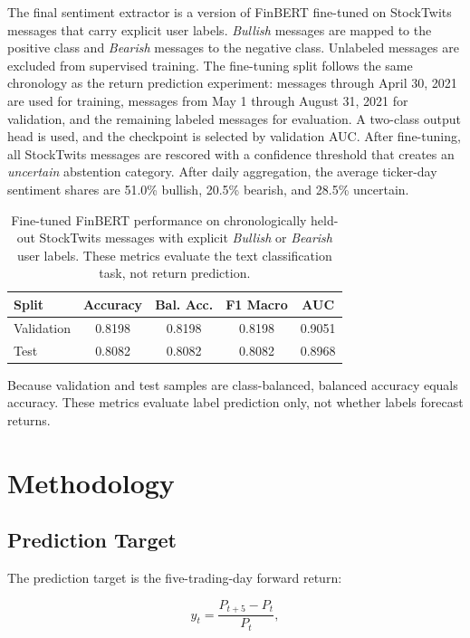 \documentclass[10pt,twocolumn]{article}
\begin{document}
The final sentiment extractor is a version of FinBERT fine-tuned on StockTwits messages that carry explicit user labels. \textit{Bullish} messages are mapped to the positive class and \textit{Bearish} messages to the negative class. Unlabeled messages are excluded from supervised training. The fine-tuning split follows the same chronology as the return prediction experiment: messages through April 30, 2021 are used for training, messages from May 1 through August 31, 2021 for validation, and the remaining labeled messages for evaluation. A two-class output head is used, and the checkpoint is selected by validation AUC. After fine-tuning, all StockTwits messages are rescored with a confidence threshold that creates an \textit{uncertain} abstention category. After daily aggregation, the average ticker-day sentiment shares are 51.0\% bullish, 20.5\% bearish, and 28.5\% uncertain.

\begin{table}[h]
\centering
\small
\begin{tabular}{lcccc}
\toprule
Split & Accuracy & Bal. Acc. & F1 Macro & AUC \\
\midrule
Validation & 0.8198 & 0.8198 & 0.8198 & 0.9051 \\
Test & 0.8082 & 0.8082 & 0.8082 & 0.8968 \\
\bottomrule
\end{tabular}
\caption{Fine-tuned FinBERT performance on chronologically held-out StockTwits messages with explicit \textit{Bullish} or \textit{Bearish} user labels. These metrics evaluate the text classification task, not return prediction.}
\label{tab:finbert_finetune}
\end{table}

Because validation and test samples are class-balanced, balanced accuracy equals accuracy. These metrics evaluate label prediction only, not whether labels forecast returns.

\section{Methodology}

\subsection{Prediction Target}

The prediction target is the five-trading-day forward return:

\begin{equation}
y_t = \frac{P_{t+5} - P_t}{P_t},
\end{equation}
\end{document}
